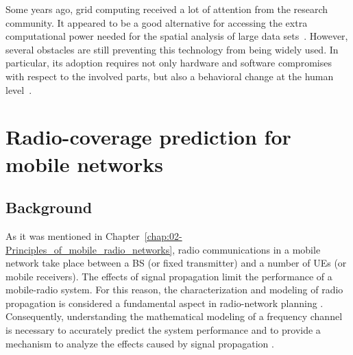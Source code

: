 Some years ago, grid computing received a lot of attention from the
research community. It appeared to be a good alternative for accessing
the extra computational power needed for the spatial analysis of large
data sets~\cite{Armstrong_Using_a_computational_grid_for_geographic_information_analysis:2005,Vouk_Cloud_computing_issues_research_and_implementations:2008,Wang_A_cybergis_framework_for_the_synthesis_of_cyberinfrastructure_GIS_and_spatial_analysis:2010}.
However, several obstacles are still preventing this technology from
being widely used. In particular, its adoption requires not only hardware
and software compromises with respect to the involved parts, but also
a behavioral change at the human level~\cite{Armstrong_Using_a_computational_grid_for_geographic_information_analysis:2005}.


\section{Radio-coverage prediction for mobile networks \label{sec:04-Radio_coverage_prediction_for_mobile_networks}}


\subsection{Background}

As it was mentioned in Chapter~\ref{chap:02-Principles_of_mobile_radio_networks},
radio communications in a mobile network take place between a BS (or
fixed transmitter) and a number of UEs (or mobile receivers). The
effects of signal propagation limit the performance of a mobile-radio
system. For this reason, the characterization and modeling of radio
propagation is considered a fundamental aspect in radio-network planning
\cite{Ahmad:Studying_different_propagation_models_for_LTE_system:2012}.
Consequently, understanding the mathematical modeling of a frequency
channel is necessary to accurately predict the system performance
and to provide a mechanism to analyze the effects caused by signal
propagation \cite{Parsons-The_mobile_radio_propagation_channel:2000}.

